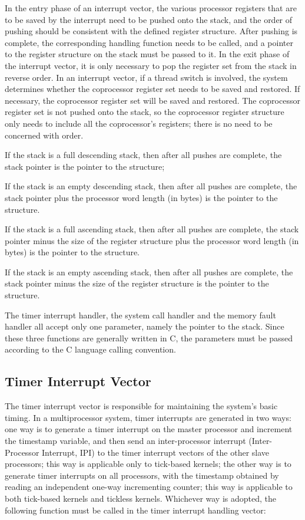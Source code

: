 In the entry phase of an interrupt vector, the various processor registers that are to be saved by the interrupt need to be pushed onto the stack, and the order of pushing should be consistent with the defined register structure. After pushing is complete, the corresponding handling function needs to be called, and a pointer to the register structure on the stack must be passed to it. In the exit phase of the interrupt vector, it is only necessary to pop the register set from the stack in reverse order. In an interrupt vector, if a thread switch is involved, the system determines whether the coprocessor register set needs to be saved and restored. If necessary, the coprocessor register set will be saved and restored. The coprocessor register set is not pushed onto the stack, so the coprocessor register structure only needs to include all the coprocessor's registers; there is no need to be concerned with order.

If the stack is a full descending stack, then after all pushes are complete, the stack pointer is the pointer to the structure;

If the stack is an empty descending stack, then after all pushes are complete, the stack pointer plus the processor word length (in bytes) is the pointer to the structure.

If the stack is a full ascending stack, then after all pushes are complete, the stack pointer minus the size of the register structure plus the processor word length (in bytes) is the pointer to the structure.

If the stack is an empty ascending stack, then after all pushes are complete, the stack pointer minus the size of the register structure is the pointer to the structure.

The timer interrupt handler, the system call handler and the memory fault handler all accept only one parameter, namely the pointer to the stack. Since these three functions are generally written in C, the parameters must be passed according to the C language calling convention.

\subsection{Timer Interrupt Vector}\label{subsec:7-timer-interrupt-vector}
\nopagebreak[4]

The timer interrupt vector is responsible for maintaining the system's basic timing. In a multiprocessor system, timer interrupts are generated in two ways: one way is to generate a timer interrupt on the master processor and increment the timestamp variable, and then send an inter-processor interrupt (Inter-Processor
Interrupt, IPI) to the timer interrupt vectors of the other slave processors; this way is applicable only to tick-based kernels; the other way is to generate timer interrupts on all processors, with the timestamp obtained by reading an independent one-way incrementing counter; this way is applicable to both tick-based kernels and tickless kernels. Whichever way is adopted, the following function must be called in the timer interrupt handling vector:

